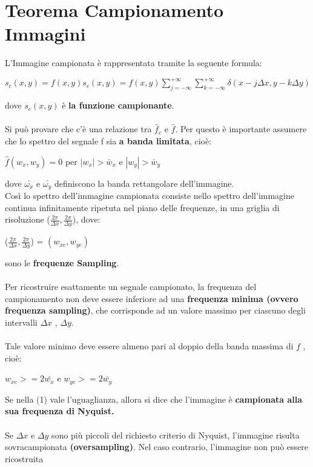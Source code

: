 \section{Teorema Campionamento Immagini}
L'Immagine campionata è rappresentata tramite la seguente formula:
\begin{center}
    $s_c(x,y) = f(x,y)s_c(x,y)=f(x,y)\sum_{j=-\infty}^{+\infty} \sum_{k=-\infty}^{+\infty} \delta (x-j \Delta x, y-k \Delta y)$
\end{center}
dove $s_c(x,y)$ è \textbf{la funzione campionante}.
\\\\Si può provare che c’è una relazione tra $\hat{f}_c$ e $\hat{f}$. Per questo è importante assumere che lo spettro del segnale f sia \textbf{a banda limitata}, cioè:
\begin{center}
    $\hat{f}(w_x,w_y)=0$ per $|w_x| > \bar{w}_x$ e $|w_y| > \bar{w}_y$
\end{center}
dove $\bar{ω_x}$ e $\bar{ω_y}$ definiscono la banda rettangolare dell’immagine.
\\Così lo spettro dell’immagine campionata consiste nello spettro
dell’immagine continua infinitamente ripetuta nel piano delle
frequenze, in una griglia di risoluzione ($\frac{2\pi}{\Delta x}, \frac{2 \pi}{\Delta y}$), dove:
\begin{center}
    ($\frac{2\pi}{\Delta x}, \frac{2 \pi}{\Delta y}$) = $(w_{xe}, w_{ye})$
\end{center}
sono le \textbf{frequenze Sampling}.
\\\\Per ricostruire esattamente un segnale campionato, la frequenza
del campionamento non deve essere inferiore ad una \textbf{frequenza
    minima (ovvero frequenza sampling)}, che corrisponde ad un valore
massimo per ciascuno degli intervalli $\Delta x$ , $\Delta y$.
\\\\Tale valore minimo deve essere almeno pari al doppio della banda
massima di $f$ , cioè:
\begin{center}
    $w_{xe} >= 2 \bar{w_x}$ e $w_{ye} >= 2 \bar{w_y}$
\end{center}
Se nella (1) vale l’uguaglianza, allora si dice che l’immagine è
\textbf{campionata alla sua frequenza di Nyquist.}
\\\\Se $\Delta x$ e $\Delta y$ sono più piccoli del richiesto criterio di Nyquist,
l’immagine risulta sovracampionata \textbf{(oversampling)}.
Nel caso contrario, l’immagine non può essere ricostruita
